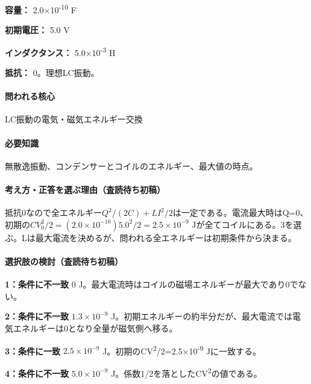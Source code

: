 \noindent\textbf{容量：} 2.0×10\textsuperscript{-10} F\par

\noindent\textbf{初期電圧：} 5.0 V\par

\noindent\textbf{インダクタンス：} 5.0×10\textsuperscript{-3} H\par

\noindent\textbf{抵抗：} 0。理想LC振動。\par

\paragraph{問われる核心} LC振動の電気・磁気エネルギー交換

\paragraph{必要知識} 無散逸振動、コンデンサーとコイルのエネルギー、最大値の時点。

\paragraph{考え方・正答を選ぶ理由（査読待ち初稿）} 抵抗0なので全エネルギー\(Q^2/(2C)+LI^2/2\)は一定である。電流最大時はQ=\allowbreak{}0、初期の\(CV_0^2/2=(2.0\times10^{-10})5.0^2/2=2.5\times10^{-9}\) Jが全てコイルにある。3を選ぶ。Lは最大電流を決めるが、問われる全エネルギーは初期条件から決まる。

\paragraph{選択肢の検討（査読待ち初稿）}\mbox{}\par

\noindent\textbf{1：条件に不一致} 0 J。最大電流時はコイルの磁場エネルギーが最大であり0でない。\par

\noindent\textbf{2：条件に不一致} \(1.3\times10^{-9}\) J。初期エネルギーの約半分だが、最大電流では電気エネルギーは0となり全量が磁気側へ移る。\par

\noindent\textbf{3：条件に一致} \(2.5\times10^{-9}\) J。初期のCV\textsuperscript{2}/2=\allowbreak{}2.5×10\textsuperscript{-9} Jに一致する。\par

\noindent\textbf{4：条件に不一致} \(5.0\times10^{-9}\) J。係数1/2を落としたCV\textsuperscript{2}の値である。\par

